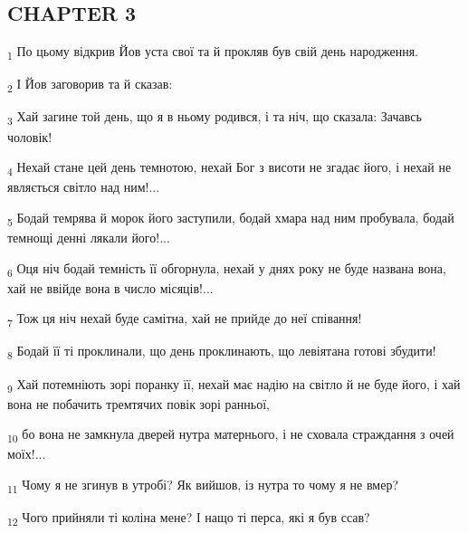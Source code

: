 \subsection{CHAPTER 3}
\begin{tcolorbox}
\textsubscript{1} По цьому відкрив Йов уста свої та й прокляв був свій день народження.
\end{tcolorbox}
\begin{tcolorbox}
\textsubscript{2} І Йов заговорив та й сказав:
\end{tcolorbox}
\begin{tcolorbox}
\textsubscript{3} Хай загине той день, що я в ньому родився, і та ніч, що сказала: Зачавсь чоловік!
\end{tcolorbox}
\begin{tcolorbox}
\textsubscript{4} Нехай стане цей день темнотою, нехай Бог з висоти не згадає його, і нехай не являється світло над ним!...
\end{tcolorbox}
\begin{tcolorbox}
\textsubscript{5} Бодай темрява й морок його заступили, бодай хмара над ним пробувала, бодай темнощі денні лякали його!...
\end{tcolorbox}
\begin{tcolorbox}
\textsubscript{6} Оця ніч бодай темність її обгорнула, нехай у днях року не буде названа вона, хай не ввійде вона в число місяців!...
\end{tcolorbox}
\begin{tcolorbox}
\textsubscript{7} Тож ця ніч нехай буде самітна, хай не прийде до неї співання!
\end{tcolorbox}
\begin{tcolorbox}
\textsubscript{8} Бодай її ті проклинали, що день проклинають, що левіятана готові збудити!
\end{tcolorbox}
\begin{tcolorbox}
\textsubscript{9} Хай потемніють зорі поранку її, нехай має надію на світло й не буде його, і хай вона не побачить тремтячих повік зорі ранньої,
\end{tcolorbox}
\begin{tcolorbox}
\textsubscript{10} бо вона не замкнула дверей нутра матернього, і не сховала страждання з очей моїх!...
\end{tcolorbox}
\begin{tcolorbox}
\textsubscript{11} Чому я не згинув в утробі? Як вийшов, із нутра то чому я не вмер?
\end{tcolorbox}
\begin{tcolorbox}
\textsubscript{12} Чого прийняли ті коліна мене? І нащо ті перса, які я був ссав?
\end{tcolorbox}
